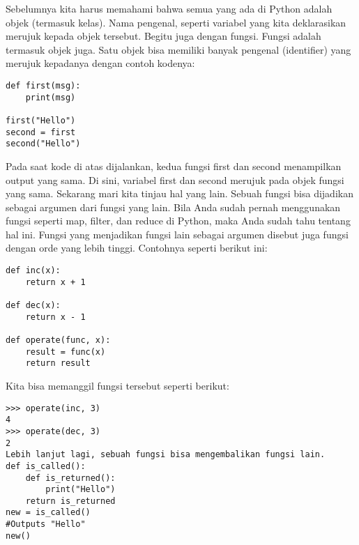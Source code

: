 \documentclass[12pt,a4paper]{article}
\begin{document}
Sebelumnya kita harus memahami bahwa semua yang ada di Python adalah objek (termasuk kelas). Nama pengenal, seperti variabel yang kita deklarasikan merujuk kepada objek tersebut. Begitu juga dengan fungsi. Fungsi adalah termasuk objek juga. Satu objek bisa memiliki banyak pengenal (identifier) yang merujuk kepadanya dengan contoh kodenya:

\begin{verbatim}
def first(msg):
    print(msg)

first("Hello")
second = first
second("Hello")
\end{verbatim}

Pada saat kode di atas dijalankan, kedua fungsi first dan second menampilkan output yang sama. Di sini, variabel first dan second merujuk pada objek fungsi yang sama.
Sekarang mari kita tinjau hal yang lain. Sebuah fungsi bisa dijadikan sebagai argumen dari fungsi yang lain.
Bila Anda sudah pernah menggunakan fungsi seperti map, filter, dan reduce di Python, maka Anda sudah tahu tentang hal ini.
Fungsi yang menjadikan fungsi lain sebagai argumen disebut juga fungsi dengan orde yang lebih tinggi. Contohnya seperti berikut ini:

\begin{verbatim}
def inc(x):
    return x + 1
    
def dec(x):
    return x - 1
    
def operate(func, x):
    result = func(x)
    return result
\end{verbatim}


Kita bisa memanggil fungsi tersebut seperti berikut:

\begin{verbatim}
>>> operate(inc, 3)
4
>>> operate(dec, 3)
2
Lebih lanjut lagi, sebuah fungsi bisa mengembalikan fungsi lain.
def is_called():
    def is_returned():
        print("Hello")
    return is_returned
new = is_called()
#Outputs "Hello"
new()
\end{verbatim}
\end{document}
